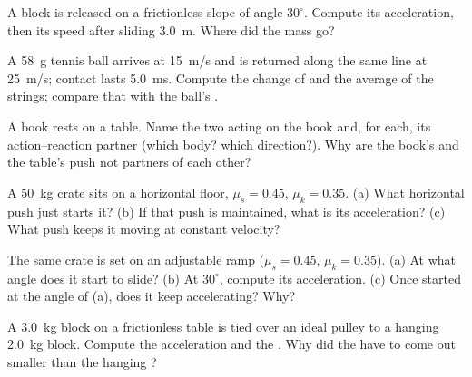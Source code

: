 \begin{exercise}[$\star$]\label{exo:g12:newtons-laws:3}
A block is released on a frictionless slope of angle $30^\circ$. Compute its
acceleration, then its speed after sliding \qty{3.0}{m}. Where did the mass go?
\end{exercise}

\begin{exercise}[$\star$]\label{exo:g12:newtons-laws:4}
A \qty{58}{g} tennis ball arrives at \qty{15}{m/s} and is returned along the same
line at \qty{25}{m/s}; contact lasts \qty{5.0}{ms}. Compute the change of 
and the average  of the strings; compare that  with the ball's .
\end{exercise}

\begin{exercise}[$\star$]\label{exo:g12:newtons-laws:5}
A book rests on a table. Name the two  acting on the book and, for each, its
action--reaction partner (which body? which direction?). Why are the book's 
and the table's push not partners of each other?
\end{exercise}

\begin{exercise}[$\star\star$]\label{exo:g12:newtons-laws:6}
A \qty{50}{kg} crate sits on a horizontal floor, $\mu_s = 0.45$, $\mu_k = 0.35$.
(a) What horizontal push just starts it? (b) If that push is maintained, what is its
acceleration? (c) What push keeps it moving at constant velocity?
\end{exercise}

\begin{exercise}[$\star\star$]\label{exo:g12:newtons-laws:7}
The same crate is set on an adjustable ramp ($\mu_s = 0.45$, $\mu_k = 0.35$). (a) At
what angle does it start to slide? (b) At $30^\circ$, compute its acceleration.
(c) Once started at the angle of (a), does it keep accelerating? Why?
\end{exercise}

\begin{exercise}[$\star\star$]\label{exo:g12:newtons-laws:8}
A \qty{3.0}{kg} block on a frictionless table is tied over an ideal pulley to a
hanging \qty{2.0}{kg} block. Compute the acceleration and the . Why did the
 have to come out smaller than the hanging ?
\end{exercise}

